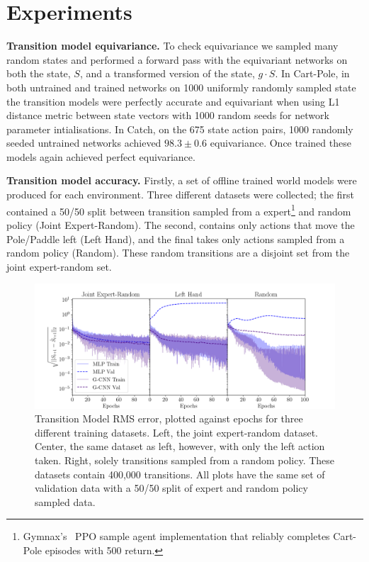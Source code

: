 \documentclass[mlabstract]{jmlr}
\begin{document}

\vspace{-10}
\section{Experiments}

\indent \indent \textbf{Transition model equivariance.} To check equivariance we sampled many random states and performed a forward pass with the equivariant networks on both the state, $S$, and a transformed version of the state, $g \cdot S$. In Cart-Pole, in both untrained and trained networks on 1000 uniformly randomly sampled state the transition models were perfectly accurate and equivariant when using L1 distance metric between state vectors with 1000 random seeds for network parameter intialisations. In Catch, on the 675 state action pairs, 1000 randomly seeded untrained networks achieved $98.3 \pm 0.6$ equivariance. Once trained these models again achieved perfect equivariance.

\textbf{Transition model accuracy.} Firstly, a set of offline trained world models were produced for each environment. Three different datasets were collected; the first contained a 50/50 split between transition sampled from a expert\footnote{Gymnax's~\cite{lu2022discovered} PPO sample agent implementation that reliably completes Cart-Pole episodes with 500 return.} and random policy (Joint Expert-Random). The second, contains only actions that move the Pole/Paddle left (Left Hand), and the final takes only actions sampled from a random policy (Random). These random transitions are a disjoint set from the joint expert-random set.

\begin{figure}
	\centering
	\includegraphics[width=.65\textwidth]{Figures/transition_model_loss.png}
	\caption{Transition Model RMS error, plotted against epochs for three different training
		datasets. Left, the joint expert-random dataset. Center, the same dataset as
		left, however, with only the left action taken. Right, solely transitions sampled
		from a random policy. These datasets contain 400,000 transitions. All plots have
		the same set of validation data with a 50/50 split of expert and random policy
		sampled data.}\label{fig:tm_cp}
\end{figure}
\end{document}
